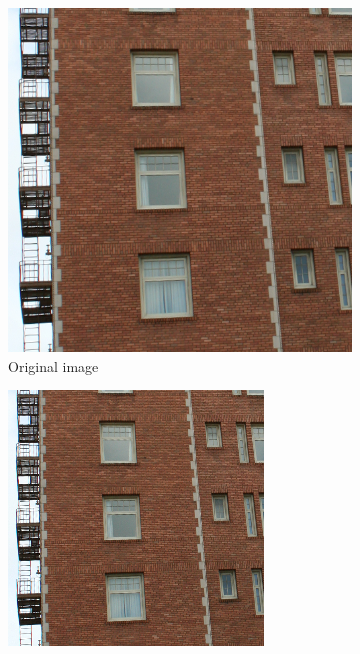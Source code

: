 \documentclass{article}
\begin{document}
\begin{figure}[h]
	\centering
	\begin{subfigure}[t]{0.49\textwidth}
		\includegraphics[width = \textwidth]{aliasbrick1.png}
		\caption{Original image}
		\label{fig:aliasbrick1.png}
	\end{subfigure}
	\begin{subfigure}[t]{0.49\textwidth}
		\includegraphics[width = \textwidth]{aliasbrick2.png}

\end{subfigure}
\end{figure}
\end{document}
